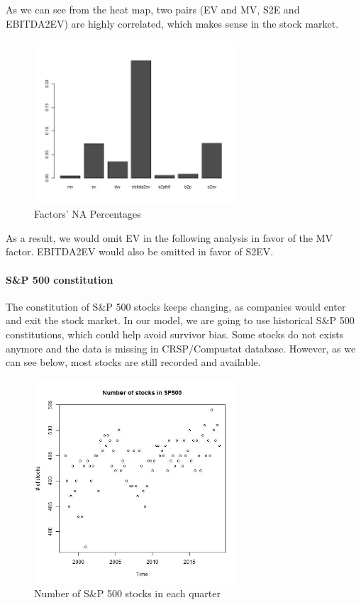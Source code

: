 \documentclass[]{article}
\let\oldparagraph\paragraph
\renewcommand{\paragraph}[1]{\oldparagraph{#1}\mbox{}}
\begin{document}
As we can see from the heat map, two pairs (EV and MV, S2E and
EBITDA2EV) are highly correlated, which makes sense in the stock market.

\begin{figure}[H]
\begin{center}
\includegraphics[width=3in]{Lab//NA_in_factors.jpg}
\caption{Factors' NA Percentages}
\label{figure2}
\end{center}
\end{figure}

As a result, we would omit EV in the following analysis in favor of the
MV factor. EBITDA2EV would also be omitted in favor of S2EV.

\hypertarget{sp-500-constitution}{%
\paragraph{S\&P 500 constitution}\label{sp-500-constitution}}

The constitution of S\&P 500 stocks keeps changing, as companies would
enter and exit the stock market. In our model, we are going to use
historical S\&P 500 constitutions, which could help avoid survivor bias.
Some stocks do not exists anymore and the data is missing in
CRSP/Compustat database. However, as we can see below, most stocks are
still recorded and available.

\begin{figure}[H]
\begin{center}
\includegraphics[width=3in]{Lab//Num_of_SP500.jpg}
\caption{Number of S\&P 500 stocks in each quarter}
\label{figure3}
\end{center}
\end{figure}
\end{document}
